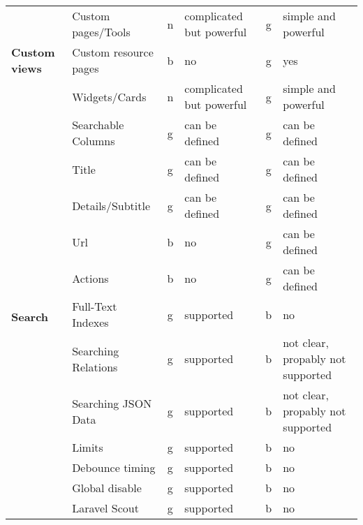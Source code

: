 \begin{table}[!ht]
{\begin{tabular}{llclcl}
            \hline
            \multirow{3}{*}{\textbf{Custom views}}   & Custom pages/Tools     & n  & complicated but powerful       & g  & simple and powerful                     \\
            & Custom resource pages  & b  & no                             & g  & yes                                     \\
            & Widgets/Cards          & n  & complicated but powerful       & g  & simple and powerful                     \\
            \hline
            \multirow{12}{*}{\textbf{Search}}        & Searchable Columns     & g  & can be defined                 & g  & can be defined                          \\
            & Title                  & g  & can be defined                 & g  & can be defined                          \\
            & Details/Subtitle       & g  & can be defined                 & g  & can be defined                          \\
            & Url                    & b  & no                             & g  & can be defined                          \\
            & Actions                & b  & no                             & g  & can be defined                          \\
            & Full-Text Indexes      & g  & supported                      & b  & no                                      \\
            & Searching Relations    & g  & supported                      & b  & not clear, propably not supported       \\
            & Searching JSON Data    & g  & supported                      & b  & not clear, propably not supported       \\
            & Limits                 & g  & supported                      & b  & no                                      \\
            & Debounce timing        & g  & supported                      & b  & no                                      \\
            & Global disable         & g  & supported                      & b  & no                                      \\
            & Laravel Scout          & g  & supported                      & b  & no                                      \\
            \hline

\end{tabular}}
\end{table}

